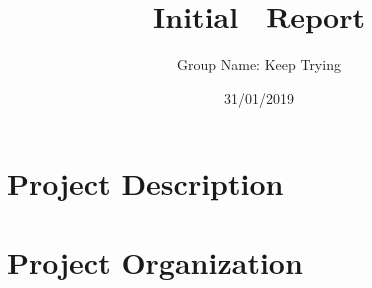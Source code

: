 \documentclass[11pt]{article}
\title{\Huge $\mathbf{Initial \quad Report}$}
\author{\Large Group Name: Keep Trying}
\date{31/01/2019}
\begin{document}
\maketitle

\thispagestyle{empty}


\newpage
\setcounter{page}{1}
\vspace{5cm}

\section{Project Description}




\section{Project Organization}

\end{document}
